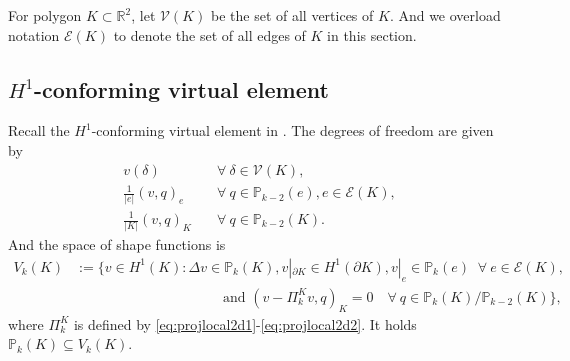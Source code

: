 \documentclass[10pt]{amsart}
\renewcommand{\div}{\operatorname{div}}
\numberwithin{equation}{section}
\begin{document}

For polygon $K\subset\mathbb R^2$, let $\mathcal{V}(K)$ be the set of all vertices of $K$. And we overload notation $\mathcal{E}(K)$ to denote the set of all edges of $K$ in this section.


\subsection{$H^1$-conforming virtual element}

Recall the $H^1$-conforming virtual element in \cite{Huang2021,AhmadAlsaediBrezziMariniEtAl2013,BeiraoBrezziCangianiManziniEtAl2013,BeiraoBrezziMariniRusso2014}.
The degrees of freedom are given by
\begin{align}
v(\delta) & \quad\forall~\delta\in\mathcal V(K), \label{eq:cfmvemdof1}\\
\frac{1}{|e|}(v, q)_e & \quad\forall~q\in\mathbb P_{k-2}(e), e\in\mathcal E(K), \label{eq:cfmvemdof2}\\
\frac{1}{|K|}(v, q)_K & \quad\forall~q\in\mathbb P_{k-2}(K). \label{eq:cfmvemdof3}
\end{align}
And the space of shape functions is
\begin{align*}
V_k(K)&:=\big\{ v\in H^1(K): \Delta v\in \mathbb P_{k}(K),  v|_{\partial K}\in H^1(\partial K),  v|_e\in \mathbb P_{k}(e)\;\;\forall~e\in\mathcal E(K),\\    
&\qquad\qquad\qquad\qquad\qquad\;\; \textrm{and } (v-\Pi_k^Kv, q)_K=0\quad\forall~q\in\mathbb P_{k}(K)/\mathbb P_{k-2}(K)\},
\end{align*}
where $\Pi_k^K$ is defined by \eqref{eq:projlocal2d1}-\eqref{eq:projlocal2d2}.
It holds $\mathbb P_k(K)\subseteq V_k(K)$.
\end{document}
